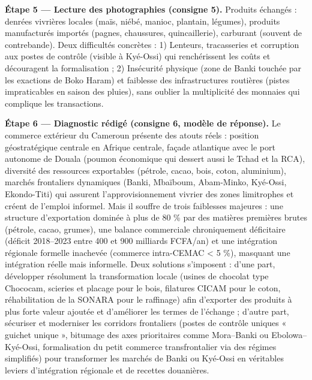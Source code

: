 \documentclass[11pt]{article}
\newcommand{\cle}[1]{{\popxbold\color{popdark}#1}}
\begin{document}
\begin{exoresolu}
\textbf{Étape 5 — Lecture des photographies (consigne 5).} Produits échangés : denrées vivrières locales (maïs, niébé, manioc, plantain, légumes), produits manufacturés importés (pagnes, chaussures, quincaillerie), carburant (souvent de contrebande). Deux difficultés concrètes : 1) Lenteurs, tracasseries et corruption aux postes de contrôle (visible à Kyé-Ossi) qui renchérissent les coûts et découragent la formalisation ; 2) Insécurité physique (zone de Banki touchée par les exactions de Boko Haram) et faiblesse des infrastructures routières (pistes impraticables en saison des pluies), sans oublier la multiplicité des monnaies qui complique les transactions.

\textbf{Étape 6 — Diagnostic rédigé (consigne 6, modèle de réponse).} Le commerce extérieur du Cameroun présente des atouts réels : position géostratégique centrale en Afrique centrale, façade atlantique avec le port autonome de Douala (poumon économique qui dessert aussi le Tchad et la RCA), diversité des ressources exportables (pétrole, cacao, bois, coton, aluminium), marchés frontaliers dynamiques (Banki, Mbaïboum, Abam-Minko, Kyé-Ossi, Ekondo-Titi) qui assurent l'approvisionnement vivrier des zones limitrophes et créent de l'emploi informel. Mais il souffre de trois faiblesses majeures : une structure d'exportation dominée à plus de 80 \% par des matières premières brutes (pétrole, cacao, grumes), une balance commerciale chroniquement déficitaire (déficit 2018--2023 entre 400 et 900 milliards FCFA/an) et une intégration régionale formelle inachevée (commerce intra-CEMAC < 5 \%), masquant une intégration réelle mais informelle. Deux solutions s'imposent : d'une part, développer résolument la \cle{transformation locale} (usines de chocolat type Chococam, scieries et placage pour le bois, filatures CICAM pour le coton, réhabilitation de la SONARA pour le raffinage) afin d'exporter des produits à plus forte valeur ajoutée et d'améliorer les termes de l'échange ; d'autre part, \cle{sécuriser et moderniser les corridors frontaliers} (postes de contrôle uniques « guichet unique », bitumage des axes prioritaires comme Mora--Banki ou Ebolowa--Kyé-Ossi, formalisation du petit commerce transfrontalier via des régimes simplifiés) pour transformer les marchés de Banki ou Kyé-Ossi en véritables leviers d'intégration régionale et de recettes douanières.
\end{exoresolu}
\end{document}
